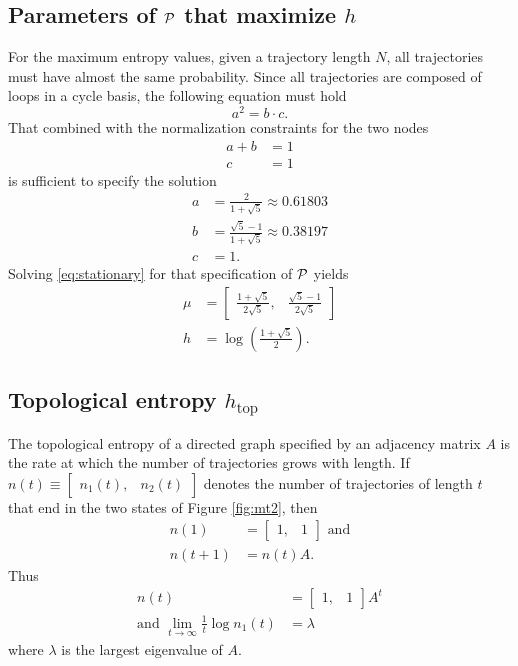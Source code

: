 \documentclass[12pt]{article} \usepackage{amsmath,amsfonts}
\newcommand{\htop}{{h_{\text{top}}}}
\newcommand{\T}{{\cal P}}
\begin{document}
\subsection{Parameters of $\T$ that maximize $h$}
\label{sec:max}

For the maximum entropy values, given a trajectory length $N$, all
trajectories must have almost the same probability.  Since all
trajectories are composed of loops in a cycle basis, the following
equation must hold
\begin{equation}
  \label{eq:excycle}
  a^2 = b\cdot c.
\end{equation}
That combined with the normalization constraints for the two nodes
\begin{align*}
  a + b &= 1 \\
  c &= 1
\end{align*}
is sufficient to specify the solution
\begin{align*}
  a &= \frac{2}{1+\sqrt{5}} \approx          0.61803\\
  b &= \frac{\sqrt{5}-1}{1+\sqrt{5}} \approx 0.38197\\
  c &= 1.
\end{align*}
Solving \eqref{eq:stationary} for that specification of $\T$ yields
\begin{align*}
  \mu &=  \begin{bmatrix} \frac{1+\sqrt{5}}{2\sqrt{5}}, &
    \frac{\sqrt{5}-1}{2\sqrt{5}} \end{bmatrix} \\
  h &= \log\left(\frac{1+\sqrt{5}}{2}\right).
\end{align*}


\subsection{Topological entropy $\htop$}
\label{sec:htop}

The topological entropy of a directed graph specified by an adjacency
matrix $A$ is the rate at which the number of trajectories grows with
length.  If $n(t)\equiv\begin{bmatrix} n_1(t),&n_2(t)\end{bmatrix}$
denotes the number of trajectories of length $t$ that end in the two
states of Figure \ref{fig:mt2}, then
\begin{align*}
  n(1) &= \begin{bmatrix} 1,&1\end{bmatrix} \text{ and} \\
  n(t+1) &= n(t) A.
\end{align*}
Thus
\begin{align*}
  n(t) &= \begin{bmatrix} 1,&1\end{bmatrix} A^t \\
  \text{and }\lim_{t\rightarrow \infty} \frac{1}{t} \log n_1(t) &=
  \lambda
\end{align*}
where $\lambda$ is the largest eigenvalue of $A$.
\end{document}
